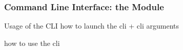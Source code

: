 \documentclass[handout]{beamer}
\begin{document}
\subsubsection{Command Line Interface: the  Module}

\begin{frame}[allowframebreaks]{Usage of the CLI}
    how to launch the cli
        + cli arguments

    how to use the cli
\end{frame}

\section*{}
\frame{\titlepage}

\section*{\bibname}


\begin{frame}\frametitle{\refname}
    \footnotesize
    
    
\end{frame}

\end{document}
